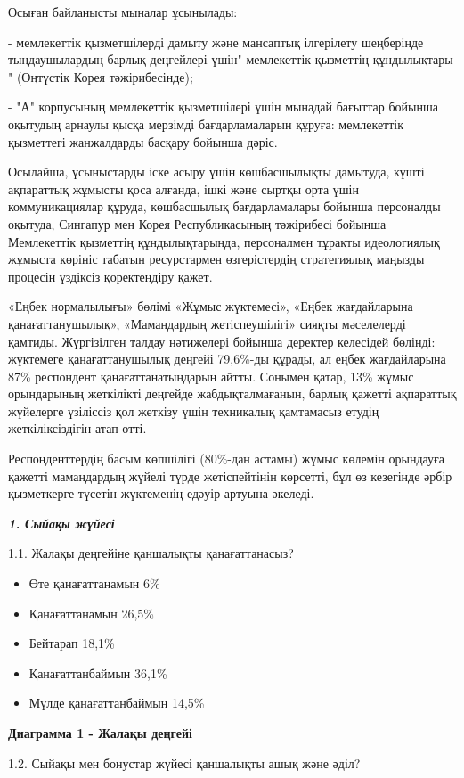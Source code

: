 Осыған байланысты мыналар ұсынылады:

- мемлекеттік қызметшілерді дамыту және мансаптық ілгерілету шеңберінде
тыңдаушылардың барлық деңгейлері үшін" мемлекеттік қызметтің
құндылықтары " (Оңтүстік Корея тәжірибесінде);

- "А" корпусының мемлекеттік қызметшілері үшін мынадай бағыттар бойынша
оқытудың арнаулы қысқа мерзімді бағдарламаларын құруға: мемлекеттік
қызметтегі жанжалдарды басқару бойынша дәріс.

Осылайша, ұсыныстарды іске асыру үшін көшбасшылықты дамытуда, күшті
ақпараттық жұмысты қоса алғанда, ішкі және сыртқы орта үшін
коммуникациялар құруда, көшбасшылық бағдарламалары бойынша персоналды
оқытуда, Сингапур мен Корея Республикасының тәжірибесі бойынша
Мемлекеттік қызметтің құндылықтарында, персоналмен тұрақты идеологиялық
жұмыста көрініс табатын ресурстармен өзгерістердің стратегиялық маңызды
процесін үздіксіз қоректендіру қажет.

«Еңбек нормалылығы» бөлімі «Жұмыс жүктемесі», «Еңбек жағдайларына
қанағаттанушылық», «Мамандардың жетіспеушілігі» сияқты мәселелерді
қамтиды. Жүргізілген талдау нәтижелері бойынша деректер келесідей
бөлінді: жүктемеге қанағаттанушылық деңгейі 79,6\%-ды құрады, ал еңбек
жағдайларына 87\% респондент қанағаттанатындарын айтты. Сонымен қатар,
13\% жұмыс орындарының жеткілікті деңгейде жабдықталмағанын, барлық
қажетті ақпараттық жүйелерге үзіліссіз қол жеткізу үшін техникалық
қамтамасыз етудің жеткіліксіздігін атап өтті.

Респонденттердің басым көпшілігі (80\%-дан астамы) жұмыс көлемін
орындауға қажетті мамандардың жүйелі түрде жетіспейтінін көрсетті, бұл
өз кезегінде әрбір қызметкерге түсетін жүктеменің едәуір артуына
әкеледі.

\emph{{\bfseries 1. Сыйақы жүйесі}}

1.1. Жалақы деңгейіне қаншалықты қанағаттанасыз?

\begin{itemize}
\item
  Өте қанағаттанамын 6\%
\item
  Қанағаттанамын 26,5\%
\item
  Бейтарап 18,1\%
\item
  Қанағаттанбаймын 36,1\%
\item
  Мүлде қанағаттанбаймын 14,5\%
\end{itemize}

{\bfseries Диаграмма 1 - Жалақы деңгейі}

1.2. Сыйақы мен бонустар жүйесі қаншалықты ашық және әділ?

